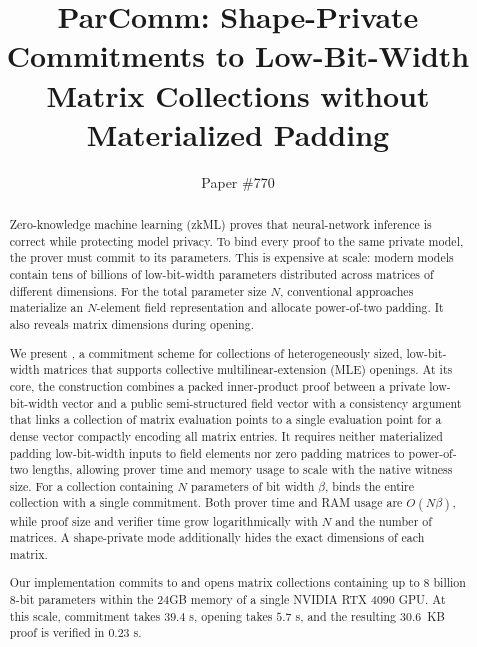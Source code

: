 \documentclass[letterpaper,twocolumn,10pt]{article}
\begin{document}

\date{}

\title{\Large \bf ParComm: Shape-Private Commitments to Low-Bit-Width Matrix Collections without Materialized Padding}

\author{{\rm Paper \#770}}

\maketitle

\begin{abstract}
Zero-knowledge machine learning (zkML) proves that neural-network inference is
correct while protecting model privacy.
To bind every proof to the same private model, the prover must commit to its parameters.
This is expensive at scale: modern models contain tens of billions of low-bit-width parameters distributed across matrices of different dimensions.
For the total parameter size $N$, conventional approaches
materialize an $N$-element field representation and allocate power-of-two
padding. It also reveals matrix dimensions during opening.

We present \methodname, a commitment scheme for collections of heterogeneously sized, low-bit-width matrices that supports collective multilinear-extension (MLE) openings.
At its core, the construction combines a packed inner-product proof between a private low-bit-width vector and a public semi-structured field vector with a consistency argument that links a collection of matrix evaluation points to a single evaluation point for a dense vector compactly encoding all matrix entries.
It requires neither materialized padding low-bit-width inputs to field elements nor zero padding matrices to power-of-two lengths, allowing prover time and memory usage to scale with the native witness size.
For a collection containing \(N\) parameters of bit width \(\beta\), \methodname binds the entire collection with a single commitment.
Both prover time and RAM usage are \(O(N\beta)\), while proof size and verifier time grow logarithmically with \(N\) and the number of matrices.
A shape-private mode additionally hides the exact dimensions of each matrix.

Our implementation commits to and opens matrix collections containing up to \(8\) billion \(8\)-bit parameters within the $24$GB memory of a single NVIDIA RTX 4090 GPU.
At this scale, commitment takes \(39.4\) s, opening takes \(5.7\) s, and the resulting \(30.6\)\, KB proof is verified in \(0.23\) s.
\end{abstract}
\end{document}
